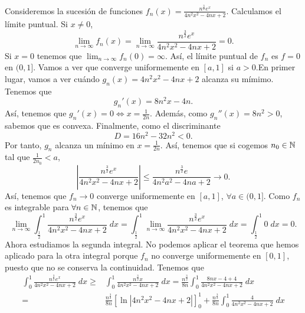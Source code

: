 \documentclass{article}
\begin{document}
\begin{sol}
Consideremos la sucesión de funciones $\displaystyle f_{n}\left(x\right) = \frac{n^{\frac{3}{2}}e^{x}}{4n^{2}x^{2}-4nx+2} $. Calculamos el límite puntual. Si $\displaystyle x \neq 0 $,
\[\lim_{n \to \infty}f_{n}\left(x\right) = \lim_{n \to \infty} \frac{n^{\frac{3}{2}}e^{x}}{4n^{2}x^{2}-4nx+2} = 0.\]
Si $\displaystyle x = 0 $ tenemos que $\displaystyle \lim_{n \to \infty}f_{n}\left(0\right) = \infty $. Así, el límite puntual de $\displaystyle f_{n} $ es $\displaystyle f = 0 $ en $\displaystyle (0,1] $. Vamos a ver que converge uniformemente en $\displaystyle [a,1] $ si $\displaystyle a > 0 $.En primer lugar, vamos a ver cuándo $\displaystyle g_{n}\left(x\right)= 4n^{2}x^{2}-4nx+2$ alcanza su mímimo. Tenemos que
\[g_{n}'\left(x\right) = 8n^{2}x - 4n .\]
Así, tenemos que $\displaystyle g_{n}'\left(x\right) = 0 \iff x = \frac{1}{2n} $. Además, como $\displaystyle g_{n}''\left(x\right) = 8n^{2} > 0 $, sabemos que es convexa. Finalmente, como el discriminante 
\[D = 16n^{2} - 32n^{2} < 0 .\]
Por tanto, $\displaystyle g_{n} $ alcanza un mínimo en $\displaystyle x =\frac{1}{2n} $. Así, tenemos que si cogemos $\displaystyle n_{0} \in \mathbb{N} $ tal que $\displaystyle \frac{1}{2n_{0}} < a $,
\[ \left|\frac{n^{\frac{3}{2}}e^{x}}{4n^{2}x^{2}-4nx+2}\right| \leq \frac{n^{\frac{3}{2}}e}{4n^{2}a^{2}-4na+2} \to 0 .\]
Así, tenemos que $\displaystyle f_{n} \to 0 $ converge uniformemente en $\displaystyle \left[a,1\right]  $, $\displaystyle \forall a \in (0,1] $. Como $\displaystyle f_{n} $ es integrable para $\displaystyle \forall n \in \mathbb{N} $, tenemos que 
\[\lim_{n \to \infty}\int^{1}_{\frac{1}{2}} \frac{n^{\frac{3}{2}}e^{x}}{4n^{2}x^{2}-4nx+2} \; dx = \int^{1}_{\frac{1}{2}} \lim_{n \to \infty}\frac{n^{\frac{3}{2}}e^{x}}{4n^{2}x^{2}-4nx+2} \; dx = \int^{1}_{\frac{1}{2}} 0 \; dx = 0 .\]
Ahora estudiamos la segunda integral. No podemos aplicar el teorema que hemos aplicado para la otra integral porque $\displaystyle f_{n} $ no converge uniformemente en $\displaystyle \left[0,1\right]  $, puesto que no se conserva la continuidad. Tenemos que 
\[
\begin{split}
	\int^{1}_{0} \frac{n^{\frac{3}{2}}e^{x}}{4n^{2}x^{2}-4nx+2} \; dx \geq & \int^{1}_{0} \frac{n^{\frac{3}{2}}x}{4n^{2}x^{2}-4nx+2} \; dx = \frac{ n^{\frac{3}{2}} }{8n}\int^{1}_{0} \frac{8nx - 4 + 4}{4n^{2}x^{2}-4nx+2}\; dx \\
	= & \frac{ n^{\frac{3}{2}} }{8n}\left[\ln \left|4n^{2}x^{2}-4nx+2\right|\right] ^{1}_{0} + \frac{n^{\frac{3}{2}}}{8n}\int^{1}_{0} \frac{4}{4n^{2}x^{2}-4nx+2} \; dx \\

\end{split}\]
\end{sol}
\end{document}
